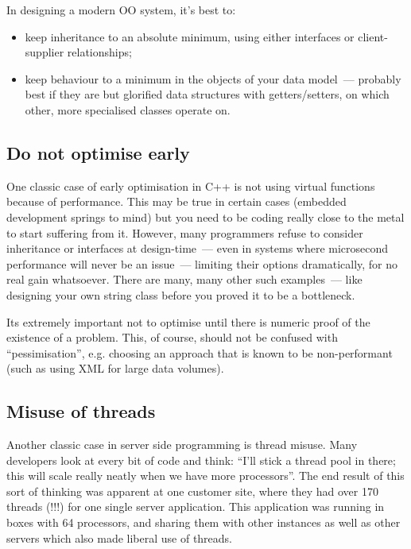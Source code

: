 \documentclass{book}
\begin{document}
In designing a modern OO system, it's best to:

\begin{itemize}
\item keep inheritance to an absolute minimum, using either interfaces
  or client-supplier relationships;
\item keep behaviour to a minimum in the objects of your data
  model~--- probably best if they are but glorified data structures
  with getters/setters, on which other, more specialised classes
  operate on.
\end{itemize}

\subsection{Do not optimise early}

One classic case of early optimisation in C++ is not using virtual
functions because of performance. This may be true in certain cases
(embedded development springs to mind) but you need to be coding
really close to the metal to start suffering from it. However, many
programmers refuse to consider inheritance or interfaces at
design-time~--- even in systems where microsecond performance will
never be an issue~--- limiting their options dramatically, for no real
gain whatsoever. There are many, many other such examples~--- like
designing your own string class before you proved it to be a
bottleneck.

Its extremely important not to optimise until there is numeric proof
of the existence of a problem. This, of course, should not be confused
with ``pessimisation'', e.g. choosing an approach that is known to be
non-performant (such as using XML for large data volumes).

\subsection{Misuse of threads}

Another classic case in server side programming is thread misuse. Many
developers look at every bit of code and think: ``I'll stick a thread
pool in there; this will scale really neatly when we have more
processors''. The end result of this sort of thinking was apparent at
one customer site, where they had over 170 threads (!!!)  for one
single server application. This application was running in boxes with
64 processors, and sharing them with other instances as well as other
servers which also made liberal use of threads.
\end{document}
